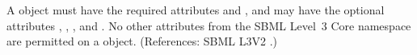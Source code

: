 A \SpeciesReference object must have the required attributes
 and , and may have the optional attributes
, , ,  and
.  No other attributes from the SBML Level~3 Core
namespace are permitted on a \SpeciesReference object.  (References: SBML
L3V2 .)
